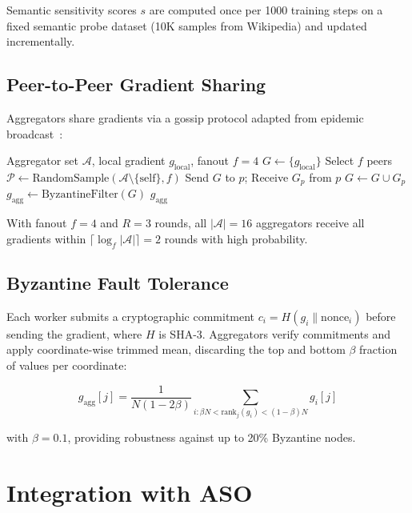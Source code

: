 \documentclass[11pt,a4paper]{article}
\begin{document}
Semantic sensitivity scores $s$ are computed once per 1000 training steps on a
fixed semantic probe dataset (10K samples from Wikipedia) and updated incrementally.

\subsection{Peer-to-Peer Gradient Sharing}

Aggregators share gradients via a gossip protocol adapted from epidemic broadcast~\cite{demers1987epidemic}:

\begin{algorithm}[H]
\caption{DSO Gossip Aggregation}
\begin{algorithmic}[1]
\REQUIRE Aggregator set $\mathcal{A}$, local gradient $g_\text{local}$, fanout $f=4$
\STATE $G \leftarrow \{g_\text{local}\}$
  \STATE Select $f$ peers $\mathcal{P} \leftarrow \text{RandomSample}(\mathcal{A} \setminus \{\text{self}\}, f)$
    \STATE Send $G$ to $p$; Receive $G_p$ from $p$
    \STATE $G \leftarrow G \cup G_p$ 
  \ENDFOR
\ENDFOR
\STATE $g_\text{agg} \leftarrow \text{ByzantineFilter}(G)$
\RETURN $g_\text{agg}$
\end{algorithmic}
\end{algorithm}

With fanout $f=4$ and $R=3$ rounds, all $|\mathcal{A}|=16$ aggregators receive
all gradients within $\lceil \log_f |\mathcal{A}| \rceil = 2$ rounds with high probability.

\subsection{Byzantine Fault Tolerance}

Each worker submits a cryptographic commitment $c_i = H(g_i \| \text{nonce}_i)$ before
sending the gradient, where $H$ is SHA-3. Aggregators verify commitments and apply
coordinate-wise trimmed mean, discarding the top and bottom $\beta$ fraction of
values per coordinate:

\begin{equation}
g_\text{agg}[j] = \frac{1}{N(1-2\beta)} \sum_{i : \beta N < \text{rank}_j(g_i) < (1-\beta)N} g_i[j]
\end{equation}

with $\beta = 0.1$, providing robustness against up to 20\% Byzantine nodes.

\section{Integration with ASO}
\end{document}
